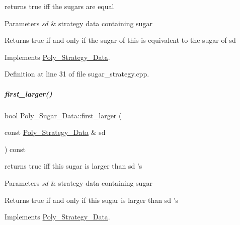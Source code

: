 returns {\ttfamily true} iff the sugars are equal 


\begin{DoxyParams}{Parameters}
{\em sd} & strategy data containing sugar \\
\hline
\end{DoxyParams}
\begin{DoxyReturn}{Returns}
{\ttfamily true} if and only if the sugar of {\ttfamily this} is equivalent to the sugar of {\ttfamily sd} 
\end{DoxyReturn}


Implements \hyperlink{group__strategygroup_aa82a57a8bf9b3c14fd65a573fd78a4a5}{Poly\+\_\+\+Strategy\+\_\+\+Data}.



Definition at line 31 of file sugar\+\_\+strategy.\+cpp.

\mbox{\label{group__strategygroup_a9ccb90a43591e465479258bdf10b5b20}} 
\subparagraph{\texorpdfstring{first\+\_\+larger()}{first\_larger()}}
{\footnotesize\ttfamily bool Poly\+\_\+\+Sugar\+\_\+\+Data\+::first\+\_\+larger (\begin{DoxyParamCaption}\item[{const \hyperlink{group__strategygroup_class_poly___strategy___data}{Poly\+\_\+\+Strategy\+\_\+\+Data} \&}]{sd }\end{DoxyParamCaption}) const\hspace{0.3cm}{\ttfamily [virtual]}}



returns {\ttfamily true} iff {\ttfamily this} sugar is larger than {\ttfamily sd} 's 


\begin{DoxyParams}{Parameters}
{\em sd} & strategy data containing sugar \\
\hline
\end{DoxyParams}
\begin{DoxyReturn}{Returns}
{\ttfamily true} if and only if {\ttfamily this} sugar is larger than {\ttfamily sd} 's 
\end{DoxyReturn}


Implements \hyperlink{group__strategygroup_a6cd4608015a6b0f06141b9b73b0d4137}{Poly\+\_\+\+Strategy\+\_\+\+Data}.



